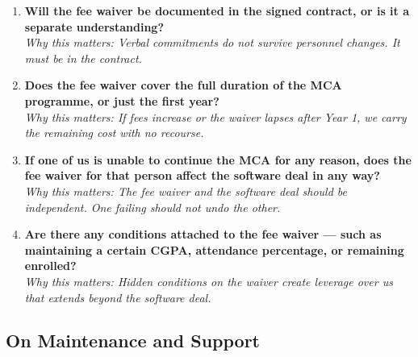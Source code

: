 \documentclass[12pt,a4paper]{article}
\begin{document}
\begin{enumerate}[leftmargin=*, label=\textbf{Q\arabic*.}, resume]

    \item \textbf{Will the fee waiver be documented in the signed contract, or is it a separate understanding?}\\
    \textit{Why this matters: Verbal commitments do not survive personnel changes. It must be in the contract.}

    \item \textbf{Does the fee waiver cover the full duration of the MCA programme, or just the first year?}\\
    \textit{Why this matters: If fees increase or the waiver lapses after Year 1, we carry the remaining cost with no recourse.}

    \item \textbf{If one of us is unable to continue the MCA for any reason, does the fee waiver for that person affect the software deal in any way?}\\
    \textit{Why this matters: The fee waiver and the software deal should be independent. One failing should not undo the other.}

    \item \textbf{Are there any conditions attached to the fee waiver — such as maintaining a certain CGPA, attendance percentage, or remaining enrolled?}\\
    \textit{Why this matters: Hidden conditions on the waiver create leverage over us that extends beyond the software deal.}

\end{enumerate}

\subsection{On Maintenance and Support}
\end{document}
